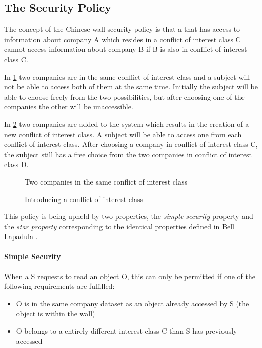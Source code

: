 \subsection{The Security Policy}
The concept of the Chinese wall security policy is that a \principal{} that has access to information about company A which resides in a conflict of interest class C cannot access information about company B if B is also in conflict of interest class C.

In \cref{conflict} two companies are in the same conflict of interest class and a subject will not be able to access both of them at the same time.
Initially the subject will be able to choose freely from the two possibilities, but after choosing one of the companies the other will be unaccessible.

In \cref{conflict2} two companies are added to the system which results in the creation of a new conflict of interest class.
A subject will be able to access one from each conflict of interest class.
After choosing a company in conflict of interest class C, the subject still has a free choice from the two companies in conflict of interest class D.
\begin{figure}
  
  \caption{Two companies in the same conflict of interest class}
  \label{conflict}
\end{figure}

\begin{figure}
  
  \caption{Introducing a conflict of interest class}
  \label{conflict2}
\end{figure}
This policy is being upheld by two properties, the \emph{simple security} property and the \emph{star property} corresponding to the identical properties defined in Bell Lapadula .

\paragraph{Simple Security}

When a \principal{} S requests to read an object O, this can only be permitted if one of the following requirements are fulfilled:

\begin{itemize}
\item O is in the same company dataset as an object already accessed by S (the object is within the wall)
\item O belongs to a entirely different interest class C than S has previously accessed
\end{itemize}

